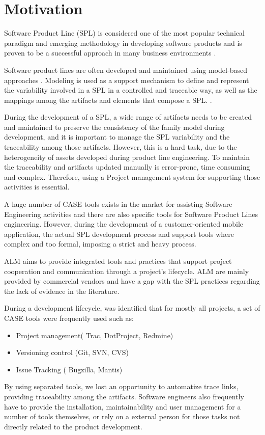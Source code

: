 \section{Motivation}
\label{sc:motivation}
Software Product Line (SPL) is considered one of the most popular technical paradigm and emerging methodology in developing software products and is proven to be a successful approach in many business environments \citep{Pohl2005}.

Software product lines are often developed and maintained using model-based approaches \citep{Dhungana}. Modeling is used as a support mechanism to define and represent the variability involved in a SPL in a controlled and traceable way, as well as the mappings among the artifacts and elements that compose a SPL. \citep{CavalcantiInTech2012}.

During the development of a \ac{SPL}, a wide range of artifacts needs to be created and maintained to preserve the consistency of the family model during development, and it is important to manage the \ac{SPL} variability and the traceability among those artifacts. However, this is a hard task, due to the heterogeneity of assets developed during product line engineering. To maintain the traceability and artifacts updated manually is error-prone, time consuming and complex. Therefore, using a Project management system for supporting those activities is essential.

A huge number of \ac{CASE} tools exists in the market for assisting  Software Engineering activities and there are also specific tools for Software Product Lines engineering. However, during the development of a customer-oriented mobile application, the actual SPL development process and support tools where complex and too formal, imposing a strict and heavy process. 

\acf{ALM} aims to provide integrated tools and practices that support project cooperation and communication through a project's lifecycle. \ac{ALM} are mainly provided by commercial vendors \citep{Schwaber2006} and have a gap with the \ac{SPL} practices regarding the lack of evidence in the literature. 

During a development lifecycle, was  identified that for mostly all projects, a set of CASE tools were frequently used such as:
\begin{itemize}
\item Project management( Trac, DotProject, Redmine)
\item Versioning control (Git, SVN, CVS)
\item Issue Tracking ( Bugzilla, Mantis)

\end{itemize}
By using separated tools, we lost an opportunity to automatize trace links, providing traceability among the artifacts. Software engineers also frequently have to provide the installation, maintainability and user management for a number of tools themselves, or rely on a external person for those tasks not directly related to the product development.


